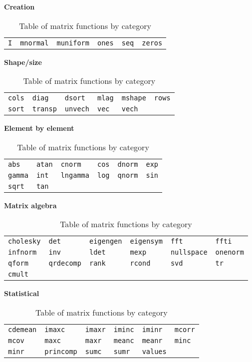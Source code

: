 \begin{table}[htbp]
\centering
\textbf{Creation}
\hrulefill

\begin{tabular}{p{\cwid}p{\cwid}p{\cwid}p{\cwid}p{\cwid}p{\cwid}}
\texttt{I}         &
\texttt{mnormal}   &
\texttt{muniform}  &
\texttt{ones}      &
\texttt{seq}       &
\texttt{zeros}     
\end{tabular}      

\textbf{Shape/size}
\hrulefill

\begin{tabular}{p{\cwid}p{\cwid}p{\cwid}p{\cwid}p{\cwid}p{\cwid}}
\texttt{cols}      &
\texttt{diag}      &
\texttt{dsort}     &
\texttt{mlag}      &
\texttt{mshape}    &
\texttt{rows}      \\
\texttt{sort}      &
\texttt{transp}    &
\texttt{unvech}    &
\texttt{vec}       &
\texttt{vech}      
\end{tabular}      

\textbf{Element by element}
\hrulefill

\begin{tabular}{p{\cwid}p{\cwid}p{\cwid}p{\cwid}p{\cwid}p{\cwid}}
\texttt{abs}       &
\texttt{atan}      &
\texttt{cnorm}     &
\texttt{cos}       &
\texttt{dnorm}     &
\texttt{exp}       \\
\texttt{gamma}     &
\texttt{int}       &
\texttt{lngamma}   &
\texttt{log}       &
\texttt{qnorm}     &
\texttt{sin}       \\
\texttt{sqrt}      &
\texttt{tan}       
\end{tabular}      

\textbf{Matrix algebra}
\hrulefill

\begin{tabular}{p{\cwid}p{\cwid}p{\cwid}p{\cwid}p{\cwid}p{\cwid}}
\texttt{cholesky}  &
\texttt{det}       &
\texttt{eigengen}  &
\texttt{eigensym}  &
\texttt{fft}       &
\texttt{ffti}      \\
\texttt{infnorm}   &
\texttt{inv}       &
\texttt{ldet}      &
\texttt{mexp}      &
\texttt{nullspace} &
\texttt{onenorm}   \\
\texttt{qform}     &
\texttt{qrdecomp}  &
\texttt{rank}      &
\texttt{rcond}     &
\texttt{svd}       &
\texttt{tr}        \\
\texttt{cmult}      
\end{tabular}      

\textbf{Statistical}
\hrulefill

\begin{tabular}{p{\cwid}p{\cwid}p{\cwid}p{\cwid}p{\cwid}p{\cwid}}
\texttt{cdemean}   &
\texttt{imaxc}     &
\texttt{imaxr}     &
\texttt{iminc}     &
\texttt{iminr}     &
\texttt{mcorr}     \\
\texttt{mcov}      &
\texttt{maxc}      &   
\texttt{maxr}      &
\texttt{meanc}     &
\texttt{meanr}     &
\texttt{minc}      \\   
\texttt{minr}      &
\texttt{princomp}  &
\texttt{sumc}      &
\texttt{sumr}      &
\texttt{values}    &
\end{tabular}      
\caption{Table of matrix functions by category}
\label{tab:matrix_funcs_cat}
\end{table}

